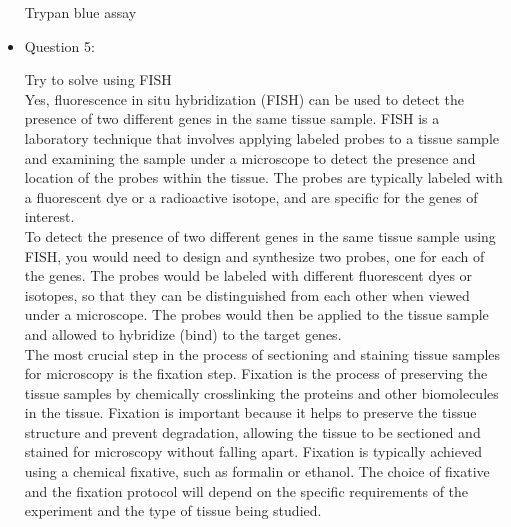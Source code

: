 \documentclass{article}
\begin{document}
\begin{itemize}
Trypan blue assay

    \item Question 5:

Try to solve using FISH\\

Yes, fluorescence in situ hybridization (FISH) can be used to detect the presence of two different genes in the same tissue sample. FISH is a laboratory technique that involves applying labeled probes to a tissue sample and examining the sample under a microscope to detect the presence and location of the probes within the tissue. The probes are typically labeled with a fluorescent dye or a radioactive isotope, and are specific for the genes of interest.\\

To detect the presence of two different genes in the same tissue sample using FISH, you would need to design and synthesize two probes, one for each of the genes. The probes would be labeled with different fluorescent dyes or isotopes, so that they can be distinguished from each other when viewed under a microscope. The probes would then be applied to the tissue sample and allowed to hybridize (bind) to the target genes.\\

The most crucial step in the process of sectioning and staining tissue samples for microscopy is the fixation step. Fixation is the process of preserving the tissue samples by chemically crosslinking the proteins and other biomolecules in the tissue. Fixation is important because it helps to preserve the tissue structure and prevent degradation, allowing the tissue to be sectioned and stained for microscopy without falling apart. Fixation is typically achieved using a chemical fixative, such as formalin or ethanol. The choice of fixative and the fixation protocol will depend on the specific requirements of the experiment and the type of tissue being studied.
    
\end{itemize}
\end{document}
